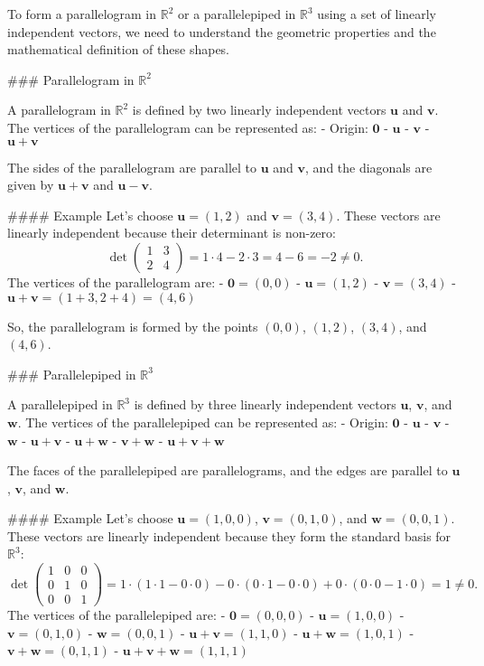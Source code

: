 To form a parallelogram in \(\mathbb{R}^2\) or a parallelepiped in \(\mathbb{R}^3\) using a set of linearly independent vectors, we need to understand the geometric properties and the mathematical definition of these shapes.

### Parallelogram in \(\mathbb{R}^2\)

A parallelogram in \(\mathbb{R}^2\) is defined by two linearly independent vectors \(\mathbf{u}\) and \(\mathbf{v}\). The vertices of the parallelogram can be represented as:
- Origin: \(\mathbf{0}\)
- \(\mathbf{u}\)
- \(\mathbf{v}\)
- \(\mathbf{u} + \mathbf{v}\)

The sides of the parallelogram are parallel to \(\mathbf{u}\) and \(\mathbf{v}\), and the diagonals are given by \(\mathbf{u} + \mathbf{v}\) and \(\mathbf{u} - \mathbf{v}\).

#### Example
Let's choose \(\mathbf{u} = (1, 2)\) and \(\mathbf{v} = (3, 4)\). These vectors are linearly independent because their determinant is non-zero:
\[
\det \begin{pmatrix} 1 & 3 \\ 2 & 4 \end{pmatrix} = 1 \cdot 4 - 2 \cdot 3 = 4 - 6 = -2 \neq 0.
\]
The vertices of the parallelogram are:
- \(\mathbf{0} = (0, 0)\)
- \(\mathbf{u} = (1, 2)\)
- \(\mathbf{v} = (3, 4)\)
- \(\mathbf{u} + \mathbf{v} = (1+3, 2+4) = (4, 6)\)

So, the parallelogram is formed by the points \((0,0)\), \((1,2)\), \((3,4)\), and \((4,6)\).

### Parallelepiped in \(\mathbb{R}^3\)

A parallelepiped in \(\mathbb{R}^3\) is defined by three linearly independent vectors \(\mathbf{u}\), \(\mathbf{v}\), and \(\mathbf{w}\). The vertices of the parallelepiped can be represented as:
- Origin: \(\mathbf{0}\)
- \(\mathbf{u}\)
- \(\mathbf{v}\)
- \(\mathbf{w}\)
- \(\mathbf{u} + \mathbf{v}\)
- \(\mathbf{u} + \mathbf{w}\)
- \(\mathbf{v} + \mathbf{w}\)
- \(\mathbf{u} + \mathbf{v} + \mathbf{w}\)

The faces of the parallelepiped are parallelograms, and the edges are parallel to \(\mathbf{u}\), \(\mathbf{v}\), and \(\mathbf{w}\).

#### Example
Let's choose \(\mathbf{u} = (1, 0, 0)\), \(\mathbf{v} = (0, 1, 0)\), and \(\mathbf{w} = (0, 0, 1)\). These vectors are linearly independent because they form the standard basis for \(\mathbb{R}^3\):
\[
\det \begin{pmatrix} 1 & 0 & 0 \\ 0 & 1 & 0 \\ 0 & 0 & 1 \end{pmatrix} = 1 \cdot (1 \cdot 1 - 0 \cdot 0) - 0 \cdot (0 \cdot 1 - 0 \cdot 0) + 0 \cdot (0 \cdot 0 - 1 \cdot 0) = 1 \neq 0.
\]
The vertices of the parallelepiped are:
- \(\mathbf{0} = (0, 0, 0)\)
- \(\mathbf{u} = (1, 0, 0)\)
- \(\mathbf{v} = (0, 1, 0)\)
- \(\mathbf{w} = (0, 0, 1)\)
- \(\mathbf{u} + \mathbf{v} = (1, 1, 0)\)
- \(\mathbf{u} + \mathbf{w} = (1, 0, 1)\)
- \(\mathbf{v} + \mathbf{w} = (0, 1, 1)\)
- \(\mathbf{u} + \mathbf{v} + \mathbf{w} = (1, 1, 1)\)

